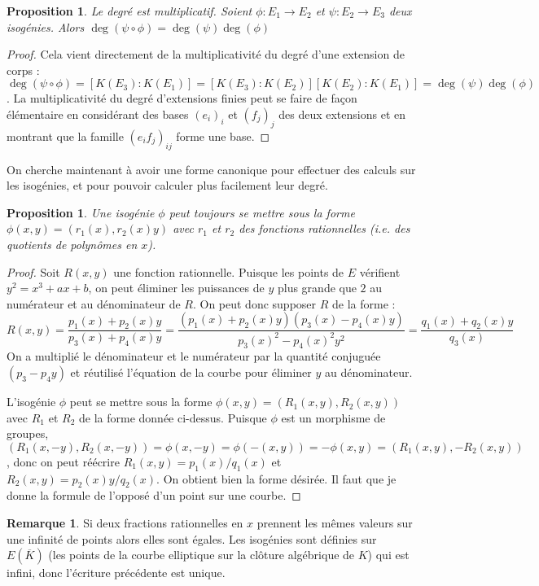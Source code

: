 \documentclass{article}
\theoremstyle{plain}%
\newtheorem{prop}[thm]{Proposition}
\theoremstyle{definition}%
\newtheorem{rem}[thm]{Remarque}
\begin{document}
\begin{prop}
  Le degré est multiplicatif. Soient $\phi : E_1\to E_2$ et $\psi : E_2\to E_3$ deux isogénies. Alors $\deg(\psi \circ \phi) = \deg(\psi)\deg(\phi)$ 
\end{prop}

\begin{proof}
  Cela vient directement de la multiplicativité du degré d'une extension de corps : $\deg(\psi \circ \phi) = [K(E_3) :K(E_1)] = [K(E_3):K(E_2)][K(E_2):K(E_1)] = \deg(\psi)\deg(\phi)$. La multiplicativité du degré d'extensions finies peut se faire de façon élémentaire en considérant des bases $(e_i)_i$ et $(f_j)_j$ des deux extensions et en montrant que la famille $(e_if_j)_{ij}$ forme une base.
\end{proof}

On cherche maintenant à avoir une forme canonique pour effectuer des calculs sur les isogénies, et pour pouvoir calculer plus facilement leur degré.

\begin{prop}
  Une isogénie $\phi$ peut toujours se mettre sous la forme $\phi(x, y) = (r_1(x), r_2(x)y)$ avec $r_1$ et $r_2$ des fonctions rationnelles (i.e. des quotients de polynômes en $x$).
\end{prop}

\begin{proof}
  Soit $R(x, y)$ une fonction rationnelle. Puisque les points de $E$ vérifient $y^2 = x^3 + ax + b$, on peut éliminer les puissances de $y$ plus grande que $2$ au numérateur et au dénominateur de $R$. On peut donc supposer $R$ de la forme : $$R(x, y) = \frac{p_1(x) + p_2(x)y}{p_3(x)+p_4(x)y} = \frac{(p_1(x) + p_2(x)y)(p_3(x)-p_4(x)y)}{p_3(x)^2 - p_4(x)^2y^2} = \frac{q_1(x) +q_2(x)y}{q_3(x)} $$
 On a multiplié le dénominateur et le numérateur par la quantité conjuguée $(p_3-p_4y)$ et réutilisé l'équation de la courbe pour éliminer $y$ au dénominateur.

 L'isogénie $\phi$ peut se mettre sous la forme $\phi(x, y) = (R_1(x, y), R_2(x, y))$ avec $R_1$ et $R_2$ de la forme donnée ci-dessus. Puisque $\phi$ est un morphisme de groupes, 
 $(R_1(x, -y), R_2(x, -y)) = \phi(x, -y) = \phi(-(x, y)) = -\phi(x, y) = (R_1(x, y), -R_2(x, y))$, donc on peut réécrire $R_1(x, y) = p_1(x) / q_1(x)$ et $R_2(x, y) = p_2(x)y/q_2(x)$. On obtient bien la forme désirée. {\color{red}Il faut que je donne la formule de l'opposé d'un point sur une courbe.}
\end{proof}

\begin{rem}
  Si deux fractions rationnelles en $x$ prennent les mêmes valeurs sur une infinité de points alors elles sont égales. Les isogénies sont définies sur $E(\overline{K})$ (les points de la courbe elliptique sur la clôture algébrique de $K$) qui est infini, donc l'écriture précédente est unique.
\end{rem}
\end{document}
